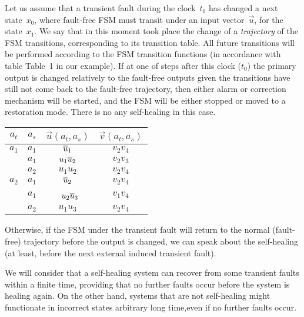 \begin{multicols}{2}
Let us assume that a transient fault during the clock~$t_0$ has
changed a next state~$x_0$, where fault-free FSM must
transit under an input vector~$\vec u$, for the state~$x_1$.
We say that in this moment took place the change of a
{\it trajectory} of the FSM transitions, corresponding
to its transition table.
All future transitions will be performed according to
the FSM transition functions (in accordance with
table Table~1 in our example).
If at one of steps after this clock ($t_0$) the
primary output is changed relatively to the
fault-free outputs given the transitions have still
not come back to the fault-free trajectory, then
either alarm or correction mechanism will be started,
and the FSM will be either stopped or moved to a
restoration mode.
There is no any self-healing in this case.

\begin{table*}\small
\begin{center}
\Caption{\ 
}
\vspace*{2ex}

\begin{tabular}{cccc}
\hline
 $a_t$  & $a_s$  & $\vec{u}(a_t,a_s)$ & $\vec v(a_t,a_s)$     \\
\hline
 $a_1$  &  $a_1$  & $\overline u_1$        & $v_2v_4$         \\
\hline
            & $a_1$  & $u_1\overline u_2$     & $v_2v_3$         \\
\hline
            &  $a_2$  & $u_1u_2$     & $v_2v_4$         \\
\hline
 $a_2$  & $a_1$  & $\overline u_2$        & $v_2v_4$         \\
\hline
            &  $a_1$  &\ $u_2\overline u_3$     & $v_1v_4$         \\
\hline
            &  $a_2$  & $u_1u_3$     & $v_2v_4$         \\
\hline
\end{tabular}
\end{center}
\end{table*}

Otherwise, if the FSM under the transient fault
will return to the normal (fault-free) trajectory
before the output is changed, we can speak about
the self-healing  (at least, before the next
external induced transient fault).

We will consider that a self-healing system can
recover from some transient faults within a finite
time, providing that no further faults occur before
the system is healing again.
On the other hand, systems that are not self-healing
might functionate in incorrect states arbitrary long time,even
if no further faults occur.


\end{multicols}
